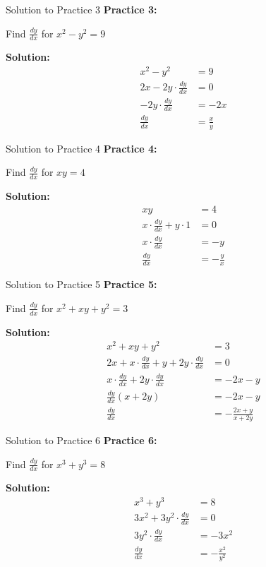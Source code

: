 \documentclass[aspectratio=169]{beamer}
\begin{document}
\begin{frame}{Solution to Practice 3}
\textbf{Practice 3:}

Find $\frac{dy}{dx}$ for $x^2 - y^2 = 9$

\textbf{Solution:}
\[
\begin{aligned}
  x^2 - y^2 &= 9 \\
  2x - 2y \cdot \frac{dy}{dx} &= 0 \\
  -2y \cdot \frac{dy}{dx} &= -2x \\
  \frac{dy}{dx} &= \frac{x}{y}
\end{aligned}
\]
\end{frame}

\begin{frame}{Solution to Practice 4}
\textbf{Practice 4:}

Find $\frac{dy}{dx}$ for $xy = 4$

\textbf{Solution:}
\[
\begin{aligned}
  xy &= 4 \\
  x \cdot \frac{dy}{dx} + y \cdot 1 &= 0 \\
  x \cdot \frac{dy}{dx} &= -y \\
  \frac{dy}{dx} &= -\frac{y}{x}
\end{aligned}
\]
\end{frame}

\begin{frame}{Solution to Practice 5}
\textbf{Practice 5:}

Find $\frac{dy}{dx}$ for $x^2 + xy + y^2 = 3$

\textbf{Solution:}
\[
\begin{aligned}
  x^2 + xy + y^2 &= 3 \\
  2x + x \cdot \frac{dy}{dx} + y + 2y \cdot \frac{dy}{dx} &= 0 \\
  x \cdot \frac{dy}{dx} + 2y \cdot \frac{dy}{dx} &= -2x - y \\
  \frac{dy}{dx}(x + 2y) &= -2x - y \\
  \frac{dy}{dx} &= -\frac{2x + y}{x + 2y}
\end{aligned}
\]
\end{frame}

\begin{frame}{Solution to Practice 6}
\textbf{Practice 6:}

Find $\frac{dy}{dx}$ for $x^3 + y^3 = 8$

\textbf{Solution:}
\[
\begin{aligned}
  x^3 + y^3 &= 8 \\
  3x^2 + 3y^2 \cdot \frac{dy}{dx} &= 0 \\
  3y^2 \cdot \frac{dy}{dx} &= -3x^2 \\
  \frac{dy}{dx} &= -\frac{x^2}{y^2}
\end{aligned}
\]
\end{frame}
\end{document}
